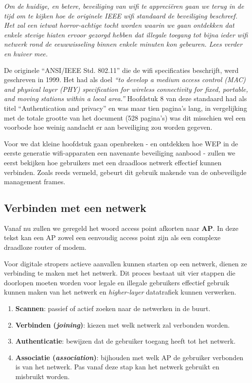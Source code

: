 \documentclass[
  10pt,
  dutch,
  paper=a4,
  ,captions=tableheading
]{scrbook}
\providecommand{\tightlist}{%
  \setlength{\itemsep}{0pt}\setlength{\parskip}{0pt}}
\begin{document}
\emph{Om de huidige, en betere, beveiliging van wifi te appreciëren gaan
we terug in de tijd om te kijken hoe de originele IEEE wifi standaard de
beveiliging beschreef. Het zal een ietwat horror-achtige tocht worden
waarin we gaan ontdekken dat enkele stevige hiaten ervoor gezorgd hebben
dat illegale toegang tot bijna ieder wifi netwerk rond de eeuwwisseling
binnen enkele minuten kon gebeuren. Lees verder en huiver mee.}

De originele ``ANSI/IEEE Std. 802.11'' die de wifi specificaties
beschrijft, werd geschreven in 1999. Het had als doel \emph{``to develop
a medium access control (MAC) and physical layer (PHY) specification for
wireless connectivity for fixed, portable, and moving stations within a
local area.''} Hoofdstuk 8 van deze standaard had als titel
``Authentication and privacy'' en was maar tien pagina's lang, in
vergelijking met de totale grootte van het document (528 pagina's) was
dit misschien wel een voorbode hoe weinig aandacht er aan beveiliging
zou worden gegeven.

Voor we dat kleine hoofdstuk gaan openbreken - en ontdekken hoe WEP in
de eerste generatie wifi-apparaten een navenante beveiliging aanbood -
zullen we eerst bekijken hoe gebruikers met een draadloos netwerk
effectief kunnen verbinden. Zoals reeds vermeld, gebeurt dit gebruik
makende van de onbeveiligde management frames.

\subsection{Verbinden met een netwerk}\label{verbinden-met-een-netwerk}

\begin{tipblock}
Vanaf nu zullen we geregeld het woord access point afkorten naar
\textbf{AP}. In deze tekst kan een AP zowel een eenvoudig access point
zijn als een complexe draadloze router of modem.
\end{tipblock}

Voor digitale stropers actieve aanvallen kunnen starten op een netwerk,
dienen ze verbinding te maken met het netwerk. Dit proces bestaat uit
vier stappen die doorlopen moeten worden voor legale en illegale
gebruikers effectief gebruik kunnen maken van het netwerk en
\emph{higher-layer} datatrafiek kunnen verwerken.

\begin{enumerate}
\def\labelenumi{\arabic{enumi}.}
\tightlist
\item
  \textbf{Scannen}: passief of actief zoeken naar de netwerken in de
  buurt.
\item
  \textbf{Verbinden (\emph{joining})}: kiezen met welk netwerk zal
  verbonden worden.
\item
  \textbf{Authenticatie}: bewijzen dat de gebruiker toegang heeft tot
  het netwerk.
\item
  \textbf{Associatie (\emph{association})}: bijhouden met welk AP de
  gebruiker verbonden is van het netwerk. Pas vanaf deze stap kan het
  netwerk gebruikt en misbruikt worden.
\end{enumerate}
\end{document}

